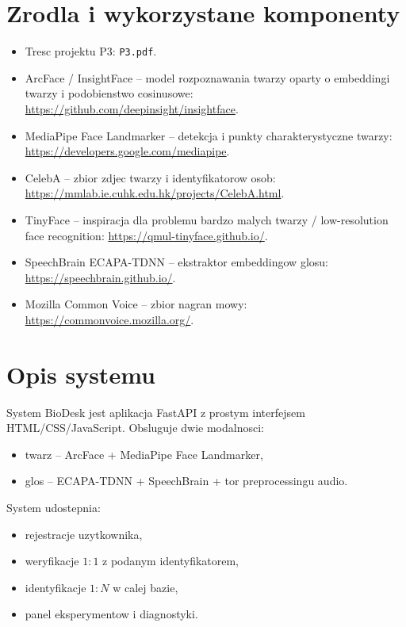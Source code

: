 \documentclass[12pt]{article}
\begin{document}
\section{Zrodla i wykorzystane komponenty}

\begin{itemize}
    \item Tresc projektu P3: \texttt{P3.pdf}.
    \item ArcFace / InsightFace -- model rozpoznawania twarzy oparty o embeddingi twarzy i podobienstwo cosinusowe: \url{https://github.com/deepinsight/insightface}.
    \item MediaPipe Face Landmarker -- detekcja i punkty charakterystyczne twarzy: \url{https://developers.google.com/mediapipe}.
    \item CelebA -- zbior zdjec twarzy i identyfikatorow osob: \url{https://mmlab.ie.cuhk.edu.hk/projects/CelebA.html}.
    \item TinyFace -- inspiracja dla problemu bardzo malych twarzy / low-resolution face recognition: \url{https://qmul-tinyface.github.io/}.
    \item SpeechBrain ECAPA-TDNN -- ekstraktor embeddingow glosu: \url{https://speechbrain.github.io/}.
    \item Mozilla Common Voice -- zbior nagran mowy: \url{https://commonvoice.mozilla.org/}.
\end{itemize}

\section{Opis systemu}

System BioDesk jest aplikacja FastAPI z prostym interfejsem HTML/CSS/JavaScript. Obsluguje dwie modalnosci:

\begin{itemize}
    \item twarz -- ArcFace + MediaPipe Face Landmarker,
    \item glos -- ECAPA-TDNN + SpeechBrain + tor preprocessingu audio.
\end{itemize}

System udostepnia:

\begin{itemize}
    \item rejestracje uzytkownika,
    \item weryfikacje $1{:}1$ z podanym identyfikatorem,
    \item identyfikacje $1{:}N$ w calej bazie,
    \item panel eksperymentow i diagnostyki.
\end{itemize}
\end{document}
